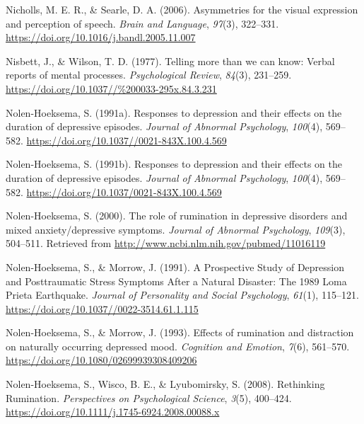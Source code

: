 \documentclass[a4paper,12pt,twoside,openright,oldfontcommands]{memoir}
\begin{document}
\leavevmode\hypertarget{ref-nicholls_asymmetries_2006}{}%
Nicholls, M. E. R., \& Searle, D. A. (2006). Asymmetries for the visual expression and perception of speech. \emph{Brain and Language}, \emph{97}(3), 322--331. \url{https://doi.org/10.1016/j.bandl.2005.11.007}

\leavevmode\hypertarget{ref-nisbett_telling_1977}{}%
Nisbett, J., \& Wilson, T. D. (1977). Telling more than we can know: Verbal reports of mental processes. \emph{Psychological Review}, \emph{84}(3), 231--259. \url{https://doi.org/10.1037//\%200033-295x.84.3.231}

\leavevmode\hypertarget{ref-nolen-hoeksema_responses_1991}{}%
Nolen-Hoeksema, S. (1991a). Responses to depression and their effects on the duration of depressive episodes. \emph{Journal of Abnormal Psychology}, \emph{100}(4), 569--582. \url{https://doi.org/10.1037//0021-843X.100.4.569}

\leavevmode\hypertarget{ref-Nolen-Hoeksema1991}{}%
Nolen-Hoeksema, S. (1991b). Responses to depression and their effects on the duration of depressive episodes. \emph{Journal of Abnormal Psychology}, \emph{100}(4), 569--582. \url{https://doi.org/10.1037/0021-843X.100.4.569}

\leavevmode\hypertarget{ref-Nolen-Hoeksema2000}{}%
Nolen-Hoeksema, S. (2000). The role of rumination in depressive disorders and mixed anxiety/depressive symptoms. \emph{Journal of Abnormal Psychology}, \emph{109}(3), 504--511. Retrieved from \url{http://www.ncbi.nlm.nih.gov/pubmed/11016119}

\leavevmode\hypertarget{ref-nolen-hoeksema_prospective_1991}{}%
Nolen-Hoeksema, S., \& Morrow, J. (1991). A Prospective Study of Depression and Posttraumatic Stress Symptoms After a Natural Disaster: The 1989 Loma Prieta Earthquake. \emph{Journal of Personality and Social Psychology}, \emph{61}(1), 115--121. \url{https://doi.org/10.1037//0022-3514.61.1.115}

\leavevmode\hypertarget{ref-nolen-hoeksema_effects_1993}{}%
Nolen-Hoeksema, S., \& Morrow, J. (1993). Effects of rumination and distraction on naturally occurring depressed mood. \emph{Cognition and Emotion}, \emph{7}(6), 561--570. \url{https://doi.org/10.1080/02699939308409206}

\leavevmode\hypertarget{ref-Nolen-Hoeksema2008}{}%
Nolen-Hoeksema, S., Wisco, B. E., \& Lyubomirsky, S. (2008). Rethinking Rumination. \emph{Perspectives on Psychological Science}, \emph{3}(5), 400--424. \url{https://doi.org/10.1111/j.1745-6924.2008.00088.x}
\end{document}
